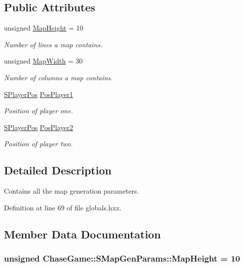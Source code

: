 \subsection*{Public Attributes}
\begin{DoxyCompactItemize}
\item 
unsigned \hyperlink{struct_chase_game_1_1_s_map_gen_params_a772c51dab66176dfe733e4e20cbf85d4}{Map\-Height} = 10
\begin{DoxyCompactList}\small\item\em Number of lines a map contains. \end{DoxyCompactList}\item 
unsigned \hyperlink{struct_chase_game_1_1_s_map_gen_params_a0897aeaa1a1a3a66697a6b441ca8c2de}{Map\-Width} = 30
\begin{DoxyCompactList}\small\item\em Number of columns a map contains. \end{DoxyCompactList}\item 
\hyperlink{struct_chase_game_1_1_s_player_pos}{S\-Player\-Pos} \hyperlink{struct_chase_game_1_1_s_map_gen_params_a8db28a9ee45a200d67b20fc803645501}{Pos\-Player1}
\begin{DoxyCompactList}\small\item\em Position of player one. \end{DoxyCompactList}\item 
\hyperlink{struct_chase_game_1_1_s_player_pos}{S\-Player\-Pos} \hyperlink{struct_chase_game_1_1_s_map_gen_params_afd0a0d4b22e228d547af88d38b6ae963}{Pos\-Player2}
\begin{DoxyCompactList}\small\item\em Position of player two. \end{DoxyCompactList}\end{DoxyCompactItemize}


\subsection{Detailed Description}
Contains all the map generation parameters. 

Definition at line 69 of file globals.\-hxx.



\subsection{Member Data Documentation}
\hypertarget{struct_chase_game_1_1_s_map_gen_params_a772c51dab66176dfe733e4e20cbf85d4}{
\subsubsection[{Map\-Height}]{\setlength{\rightskip}{0pt plus 5cm}unsigned Chase\-Game\-::\-S\-Map\-Gen\-Params\-::\-Map\-Height = 10}}\label{struct_chase_game_1_1_s_map_gen_params_a772c51dab66176dfe733e4e20cbf85d4}


